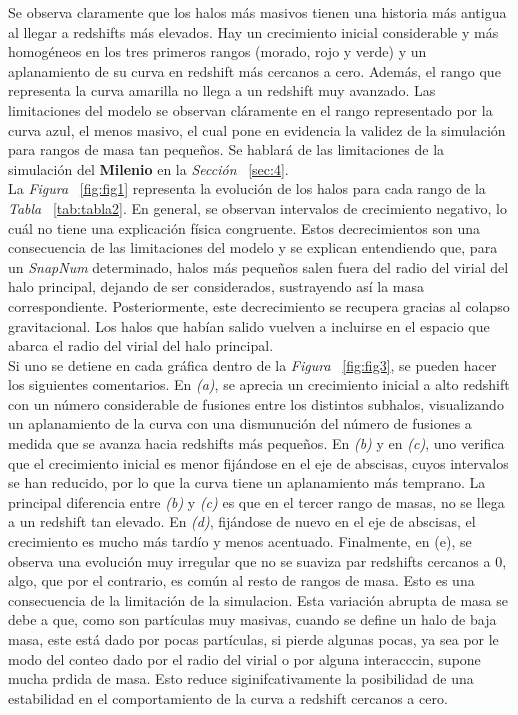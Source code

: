 Se observa claramente que los halos más masivos tienen una historia más antigua al llegar a redshifts más elevados. Hay un crecimiento inicial considerable y más homogéneos en los tres primeros rangos (morado, rojo y verde) y un aplanamiento de su curva en redshift más cercanos a cero. Además, el rango que representa la curva amarilla no llega a un redshift muy avanzado. Las limitaciones del modelo se observan cláramente en el rango representado por la curva azul, el menos masivo, el cual pone en evidencia la validez de la simulación para rangos de masa tan pequeños. Se hablará de las limitaciones de la simulación del \textbf{Milenio}\cite{6} en la \textit{Sección} ~\ref{sec:4}. \\

La \textit{Figura} ~\ref{fig:fig1} representa la evolución de los halos para cada rango de la \textit{Tabla} ~\ref{tab:tabla2}. En general, se observan intervalos de crecimiento negativo, lo cuál no tiene una explicación física congruente. Estos decrecimientos son una consecuencia de las limitaciones del modelo y se explican entendiendo que, para un \textit{SnapNum} determinado, halos más pequeños salen fuera del radio del virial del halo principal, dejando de ser considerados, sustrayendo así la masa correspondiente. Posteriormente, este decrecimiento se recupera gracias al colapso gravitacional. Los halos que habían salido vuelven a incluirse en el espacio que abarca el radio del virial del halo principal. \\

Si uno se detiene en cada gráfica dentro de la \textit{Figura} ~\ref{fig:fig3}, se pueden hacer los siguientes comentarios. En \textit{(a)}, se aprecia un crecimiento inicial a alto redshift con un número considerable de fusiones entre los distintos subhalos, visualizando un aplanamiento de la curva con una dismunución del número de fusiones a medida que se avanza hacia redshifts más pequeños. En \textit{(b)} y en \textit{(c)}, uno verifica que el crecimiento inicial es menor fijándose en el eje de abscisas, cuyos intervalos se han reducido, por lo que la curva tiene un aplanamiento más temprano. La principal diferencia entre \textit{(b)} y \textit{(c)} es que en el tercer rango de masas, no se llega a un redshift tan elevado. En \textit{(d)}, fijándose de nuevo en el eje de abscisas, el crecimiento es mucho más tardío y menos acentuado. Finalmente, en (e), se observa una evolución muy irregular que no se suaviza par redshifts cercanos a 0, algo, que por el contrario, es común al resto de rangos de masa. Esto es una consecuencia de la limitación de la simulacion. Esta variación abrupta de masa se debe a que, como son partículas muy masivas, cuando se define un halo de baja masa, este está dado por pocas partículas, si pierde algunas pocas, ya sea por le modo del conteo dado por el radio del virial o por alguna interacccin, supone mucha prdida de masa. Esto reduce siginifcativamente la posibilidad de una estabilidad en el comportamiento de la curva a redshift cercanos a cero. \\

